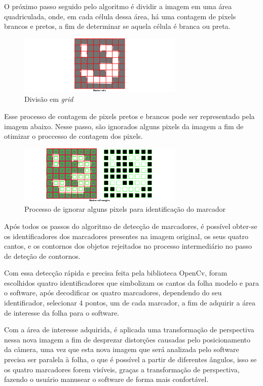 \documentclass[12pt]{report}
\begin{document}
{O próximo passo seguido pelo algoritmo é dividir a imagem em uma área quadriculada, onde, em cada célula dessa área, há uma contagem de pixels brancos e pretos, a fim de determinar se aquela célula é branca ou preta.

\begin{figure}[H]
  \centering
    \includegraphics[width=0.7\textwidth]{imagens/bits2.png}
    \caption{Divisão em {\it grid}}
  \label{fig:bits2}
\end{figure}

Esse processo de contagem de pixels pretos e brancos pode ser representado pela imagem abaixo. Nesse passo, são ignorados alguns pixels da imagem a fim de otimizar o proccesso de contagem dos pixels.

\begin{figure}[H]
  \centering
    \includegraphics[width=0.7\textwidth]{imagens/bits3.png}
    \caption{Processo de ignorar alguns pixels para identificação do marcador}
  \label{fig:bits3}
\end{figure}

Após todos os passos do algoritmo de detecção de marcadores, é possível obter-se os identificadores dos marcadores presentes na imagem original, os seus quatro cantos, e os contornos dos objetos rejeitados no processo intermediário no passo de deteção de contornos.

Com essa detecção rápida e precisa feita pela biblioteca OpenCv, foram escolhidos quatro identificadores que simbolizam os cantos da folha modelo e para o software, após decodificar os quatro marcadores, dependendo do seu identificador, selecionar 4 pontos, um de cada marcador, a fim de adquirir a área de interesse da folha para o software.

Com a área de interesse adquirida, é aplicada uma transformação de perspectiva nessa nova imagem a fim de  desprezar distorções causadas pelo posicionamento da câmera, uma vez que esta nova imagem que será analizada pelo software precisa ser paralela à folha, o que é possível a partir de diferentes ângulos, isso se os quatro marcadores forem visíveis, graças a transformação de perspectiva, fazendo o usuário manusear o software de forma mais confortável.

}
\end{document}
